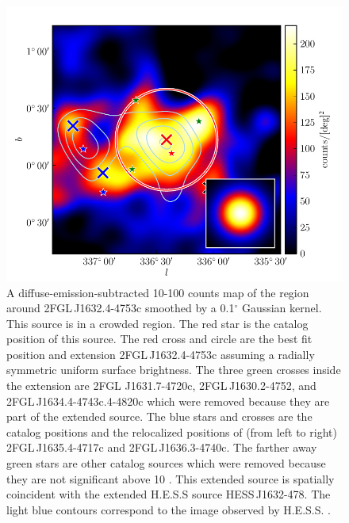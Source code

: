 \documentclass[12pt,preprint]{aastex}
\newcommand{\gev}{\text{GeV}\xspace}
\newcommand{\tev}{\text{TeV}\xspace}
\renewcommand{\deg}{\ensuremath{^\circ}\xspace}
\begin{document}
\begin{figure}
  \begin{center}
    \includegraphics[type=pdf,ext=.pdf,read=.pdf]{source_plots/source_1FGL_J1632.9-4802c}
  \end{center}
  \caption{A diffuse-emission-subtracted 10-100
  \gev counts map of the region around 2FGL\,J1632.4-4753c smoothed by
  a 0.1\deg Gaussian kernel.  This source is in a crowded region.
  The red star is the catalog position of this source.  The red
  cross and circle are the best fit position and extension 2FGL\,J1632.4-4753c 
  assuming a radially
  symmetric uniform surface brightness.
  The three
  green crosses inside the extension are 2FGL
  J1631.7-4720c, 2FGL\,J1630.2-4752, and 2FGL\,J1634.4-4743c.4-4820c
  which were removed because they are part
  of the extended source.  The blue stars and crosses are the catalog
  positions and the relocalized positions of (from left to right)
  2FGL\,J1635.4-4717c and 2FGL\,J1636.3-4740c.  The farther away green
  stars are other catalog sources which were removed because they are
  not significant above 10 \gev.  This extended source is spatially
  coincident with the extended H.E.S.S source HESS\,J1632-478.
  The light blue contours correspond to the \tev image observed by H.E.S.S.
  \citep{hess_plane_survey}.
  }\label{1FGL_J1632.9-4802c}
\end{figure}
\end{document}
